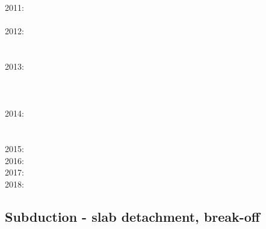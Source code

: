 2011: \cite{lixg11}\cite{list11}\cite{bubj11}\cite{bagw11b}\cite{cafz11}\cite{geme11}\cite{qube11}\\
      \cite{blgg11}\\
2012: \cite{anwb12}\cite{jahu12}\cite{jabi12}\cite{jabk12}\cite{lixg12}\cite{grpy12}\cite{grpy12b}\\
      \cite{ronb12}\cite{tebu12}\cite{thka12}\cite{bova12}\cite{civs12}\cite{camo12}\cite{cafa12} \\
      \cite{gebk12}\cite{liri12}\cite{beva12}\cite{uegb12}\\
2013: \cite{nabg13}\cite{hage13}\cite{ancv13}\cite{namu13}\cite{yosh13}\cite{zhgt13}\cite{lixg13} \\
      \cite{jabr13}\cite{izht13}\cite{luws13}\cite{dusc13}\cite{tibb13}\cite{bubj13}\cite{scmo13} \\
      \cite{fuob13}\cite{magc13}\cite{musi13}\cite{mibg13}\cite{grpy13}\cite{vagd13a}\cite{vagd13b}\\
      \cite{cavg13}\cite{vocg13}\\
2014: \cite{robn14}\cite{hond14}\cite{ronc14}\cite{mobm14}\cite{famc14}\cite{fogm14}\cite{frba14} \\
      \cite{gagd14}\cite{voge14}\cite{voge14b}\cite{lidr14}\cite{bocj04}\cite{bagb14}\cite{stjm14}\\
      \cite{basc14}\cite{vamd14}\\
2015: \cite{bemm15}\cite{bomv15}\cite{bogf15}\cite{ceag15}\cite{kifr15}\cite{vami15}\\
2016: \cite{tomy16}\cite{gukt16}\cite{robn16}\\
2017: \cite{kicf17}\\
2018: \cite{yamz18}

\subsection*{Subduction - slab detachment, break-off}

